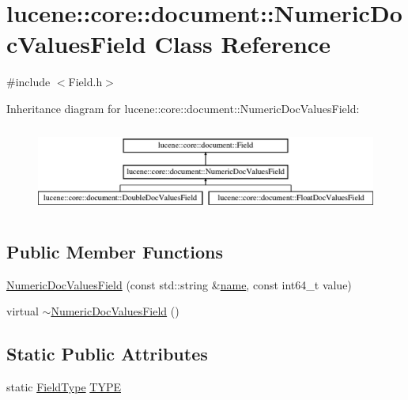 \hypertarget{classlucene_1_1core_1_1document_1_1NumericDocValuesField}{}\section{lucene\+:\+:core\+:\+:document\+:\+:Numeric\+Doc\+Values\+Field Class Reference}
\label{classlucene_1_1core_1_1document_1_1NumericDocValuesField}


{\ttfamily \#include $<$Field.\+h$>$}

Inheritance diagram for lucene\+:\+:core\+:\+:document\+:\+:Numeric\+Doc\+Values\+Field\+:\begin{figure}[H]
\begin{center}
\leavevmode
\includegraphics[height=2.866894cm]{classlucene_1_1core_1_1document_1_1NumericDocValuesField}
\end{center}
\end{figure}
\subsection*{Public Member Functions}
\begin{DoxyCompactItemize}
\item 
\mbox{\hyperlink{classlucene_1_1core_1_1document_1_1NumericDocValuesField_a5eab1eee3fb4a8410e4f2914cc70a3d5}{Numeric\+Doc\+Values\+Field}} (const std\+::string \&\mbox{\hyperlink{classlucene_1_1core_1_1document_1_1Field_a52f673f3b3abb14b180f5159f4726537}{name}}, const int64\+\_\+t value)
\item 
virtual \mbox{\hyperlink{classlucene_1_1core_1_1document_1_1NumericDocValuesField_a210b7cc10e0d4bc6326783150e44bd1e}{$\sim$\+Numeric\+Doc\+Values\+Field}} ()
\end{DoxyCompactItemize}
\subsection*{Static Public Attributes}
\begin{DoxyCompactItemize}
\item 
static \mbox{\hyperlink{classlucene_1_1core_1_1document_1_1FieldType}{Field\+Type}} \mbox{\hyperlink{classlucene_1_1core_1_1document_1_1NumericDocValuesField_a3d911f68265bf4abfe3ce797650bb239}{T\+Y\+PE}}
\end{DoxyCompactItemize}
